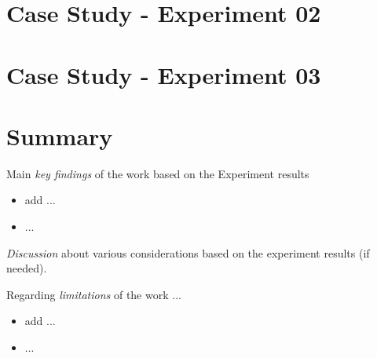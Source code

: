\section{Case Study - Experiment 02}
\section{Case Study - Experiment 03}



\section{Summary}
\label{sec:exp-summary}

Main \emph{key findings} of the work based on the Experiment results
\begin{itemize}
    \item add ...
    \item ...
\end{itemize}

\emph{Discussion} about various considerations based on the experiment results (if needed).


Regarding \emph{limitations} of the work ...
\begin{itemize}
    \item add ...
    \item ...
\end{itemize}
